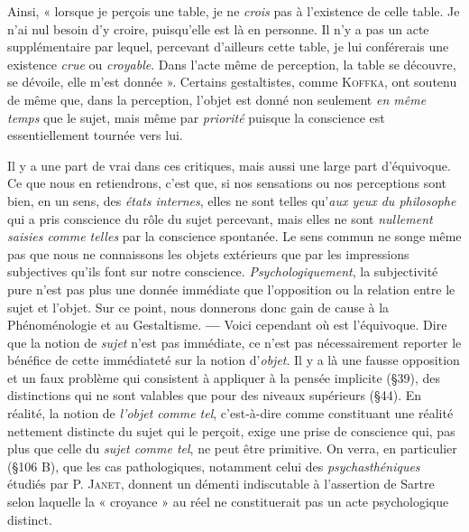 Ainsi, « lorsque je perçois une table, je ne {\it crois} pas à l’existence de
celle table. Je n’ai nul besoin d’y croire, puisqu’elle est là en personne.
Il n’y a pas un acte supplémentaire par lequel, percevant d’ailleurs
cette table, je lui conférerais une existence {\it crue} ou {\it croyable}. Dans
l’acte même de perception, la table se découvre, se dévoile, elle m’est
donnée ». Certains gestaltistes, comme \textsc{Koffka}, ont soutenu de même
que, dans la perception, l’objet est donné non seulement {\it en même
temps} que le sujet, mais même par {\it priorité} puisque la conscience est
essentiellement tournée vers lui.

Il y a une part de vrai dans ces critiques, mais aussi une large
part d’équivoque. Ce que nous en retiendrons, c’est que, si nos sensations
ou nos perceptions sont bien, en un sens, des {\it états internes}, elles
ne sont telles qu’{\it aux yeux du philosophe} qui a pris conscience du rôle
du sujet percevant, mais elles ne sont {\it nullement saisies comme telles}
par la conscience spontanée. Le sens commun ne songe même pas
que nous ne connaissons les objets extérieurs que par les impressions
subjectives qu’ils font sur notre conscience. {\it Psychologiquement}, la
subjectivité pure n’est pas plus une donnée immédiate que l’opposition
ou la relation entre le sujet et l’objet. Sur ce point, nous donnerons
donc gain de cause à la Phénoménologie et au Gestaltisme. {\bf —}
Voici cependant où est l’équivoque. Dire que la notion de {\it sujet} n’est
pas immédiate, ce n’est pas nécessairement reporter le bénéfice de
cette immédiateté sur la notion d’{\it objet}. Il y a là une fausse opposition
et un faux problème qui consistent à appliquer à la pensée implicite
(\S 39), des distinctions qui ne sont valables que pour des niveaux
supérieurs (\S 44). En réalité, la notion de {\it l’objet comme tel}, c’est-à-dire
comme constituant une réalité nettement distincte du sujet qui
le perçoit, exige une prise de conscience qui, pas plus que celle du {\it sujet
comme tel}, ne peut être primitive. On verra, en particulier (\S 106 B),
que les cas pathologiques, notamment celui des {\it psychasthéniques}
étudiés par P. \textsc{Janet}, donnent un démenti indiscutable à l’assertion
de Sartre selon laquelle la « croyance » au réel ne constituerait pas
un acte psychologique distinct.

